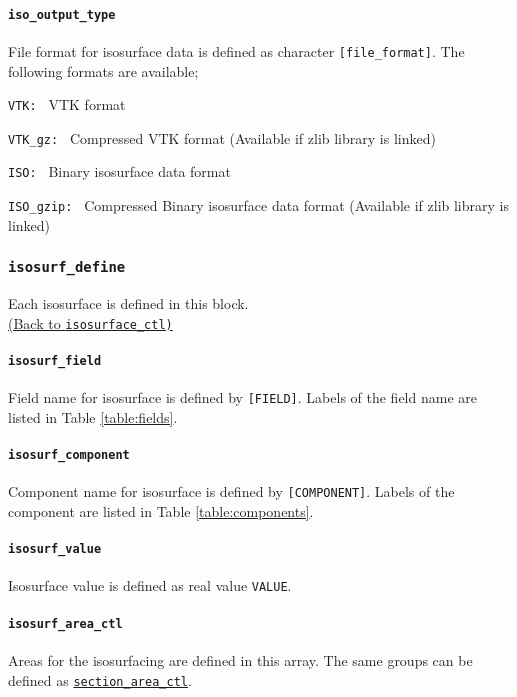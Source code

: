 \paragraph{\tt iso\_output\_type}
\label{href_t:iso_output_type}
File format for isosurface data is defined as character \verb|[file_format]|. The following formats are available;
\begin{description}
\item{\tt VTK: }               VTK format
\item{\tt VTK\_gz: }           Compressed VTK format (Available if zlib library is linked)
\item{\tt ISO: }               Binary isosurface data format
\item{\tt ISO\_gzip: }         Compressed Binary isosurface data format (Available if zlib library is linked)
\end{description}

\subsubsection{\tt isosurf\_define}
\label{href_t:isosurf_define}
Each isosurface is defined in this block. \\
\hyperref[href_i:isosurface_ctl]{(Back to {\tt isosurface\_ctl)}}

\paragraph{\tt isosurf\_field}
\label{href_t:isosurf_field}
Field name for isosurface is defined by \verb|[FIELD]|. Labels of the field name are listed in Table \ref{table:fields}. \\
%
\paragraph{\tt isosurf\_component}
\label{href_t:isosurf_component}
Component name for isosurface is defined by \verb|[COMPONENT]|. Labels of the component are listed in Table \ref{table:components}.

%
\paragraph{\tt isosurf\_value}
\label{href_t:isosurf_value}
Isosurface value is defined as real value \verb|VALUE|.

\paragraph{\tt isosurf\_area\_ctl}
\label{href_t:isosurf_area_ctl}
Areas for the isosurfacing are defined in this array. The same groups can be defined as \hyperref[href_t:psf_output_field]{\tt section\_area\_ctl}.

